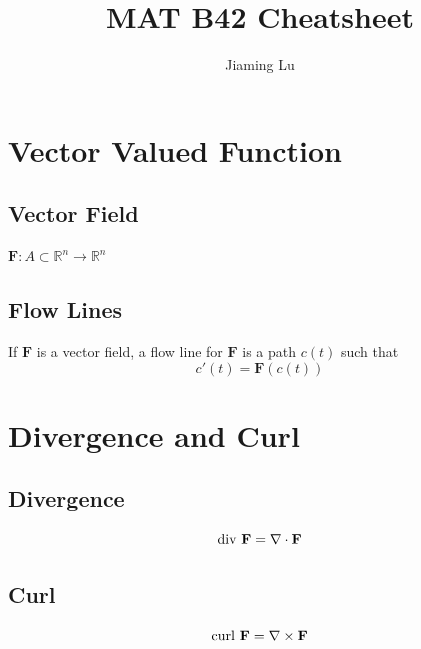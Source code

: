 \documentclass[11pt]{article}
\title{MAT B42 Cheatsheet}
\author{Jiaming Lu}
\begin{document}
\maketitle
\newpage   %

\tableofcontents %

\newpage


\section{Vector Valued Function}
\subsection{Vector Field}
$\mathbf{F} : A \subset \mathbb{R}^n\to \mathbb{R}^n$

\subsection{Flow Lines}
If $\mathbf{F}$ is a vector ﬁeld, a ﬂow line for $\mathbf{F}$ is a path $c(t)$ such that
\[c'(t) = \mathbf{F}(c(t))\]

\section{Divergence and Curl}
\subsection{Divergence}
\[ {\rm div} \ \mathbf{F} = \nabla \cdot \mathbf{F}\]

\subsection{Curl}
\[ {\rm curl} \ \mathbf{F} = \nabla \times \mathbf{F}\]
\end{document}
